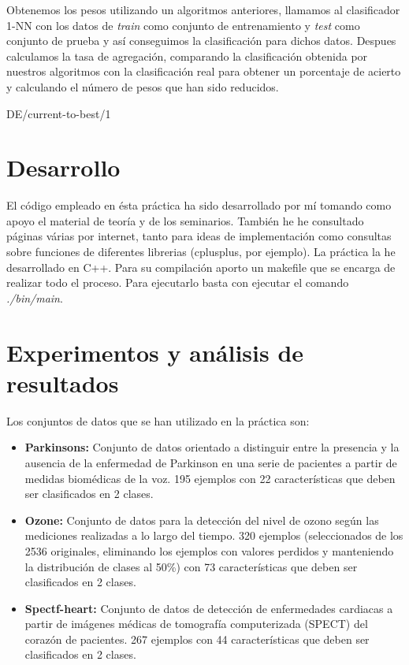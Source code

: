 \documentclass[14pt]{article}
\begin{document}
Obtenemos los pesos utilizando un algoritmos anteriores, llamamos al clasificador 1-NN con los datos de \textit{train} como conjunto de entrenamiento y \textit{test} como conjunto de prueba y así conseguimos la clasificación para dichos datos. Despues calculamos la tasa de agregación, comparando la clasificación obtenida por nuestros algoritmos con la clasificación real para obtener un porcentaje de acierto y calculando el número de pesos que han sido reducidos. 

\begin{algorithm}[H]
	\begin{algorithmic}[1]
	\label{lin:lineaRara}
	
	\end{algorithmic}
	\caption{DE/current-to-best/1}
\end{algorithm}

\section{Desarrollo}
El código empleado en ésta práctica ha sido desarrollado por mí tomando como apoyo el material de teoría y de los seminarios. También he he consultado páginas várias por internet, tanto para ideas de implementación como consultas sobre funciones de diferentes librerias (cplusplus, por ejemplo). La práctica la he desarrollado en C++. Para su compilación aporto un makefile que se encarga de realizar todo el proceso. Para ejecutarlo basta con ejecutar el comando \textit{./bin/main}. 

\section{Experimentos y análisis de resultados}
Los conjuntos de datos que se han utilizado en la práctica son:
\begin{itemize}
\item \textbf{Parkinsons:} Conjunto de datos orientado a distinguir entre la presencia y la ausencia de la enfermedad de Parkinson en una serie de pacientes a partir de medidas biomédicas de la voz. 195 ejemplos con 22 características que deben ser clasificados en 2 clases.
\item \textbf{Ozone:} Conjunto de datos para la detección del nivel de ozono según las mediciones realizadas a lo largo del tiempo. 320 ejemplos (seleccionados de los 2536 originales, eliminando los ejemplos con valores perdidos y manteniendo la distribución de clases al 50\%) con 73 características que deben ser clasificados en 2 clases.
\item \textbf{Spectf-heart:} Conjunto de datos de detección de enfermedades cardiacas a partir de imágenes médicas de tomografía computerizada (SPECT) del corazón de pacientes. 267 ejemplos con 44 características que deben ser clasificados en 2 clases. 
\end{itemize}
\end{document}
